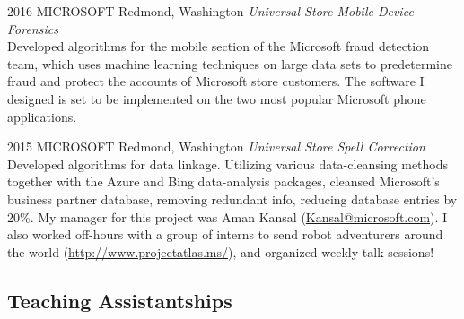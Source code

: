 \documentclass{friggeri-cv}
\begin{document}
\begin{entrylist}


\entry
{2016}
{MICROSOFT}
{Redmond, Washington}
{\emph{Universal Store Mobile Device Forensics} \\
Developed algorithms for the mobile section of the Microsoft fraud detection team, which uses machine learning techniques on large data sets to predetermine fraud and protect the accounts of Microsoft store customers. The software I designed is set to be implemented on the two most popular Microsoft phone applications. }


\entry
{2015}
{MICROSOFT}
{Redmond, Washington}
{\emph{Universal Store Spell Correction} \\
Developed algorithms for data linkage. Utilizing various data-cleansing methods together with the Azure and Bing data-analysis packages, cleansed Microsoft's business partner database, removing redundant info, reducing database entries by 20\%. My manager for this project was Aman Kansal (\href{mailto:Kansal@microsoft.com}{Kansal@microsoft.com}). I also worked off-hours with a group of interns to send robot adventurers around the world (\href{http://www.projectatlas.ms/}{http://www.projectatlas.ms/}), and organized weekly talk sessions!}

\end{entrylist}

\pagebreak[4]

\subsection{Teaching Assistantships}
\end{document}
